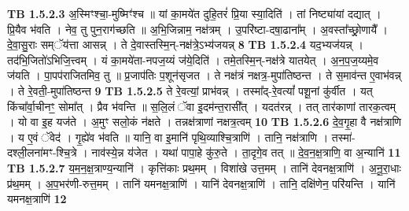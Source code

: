 \documentclass[17pt]{extarticle}
\begin{document}
                  \newline
                                \textbf{ TB 1.5.2.3} \newline
                  अ॒स्मिꣳश्चा॒-मुष्मिꣳ॑श्च ॥ यां का॒मये॑त दुहि॒तरं॑ प्रि॒या स्या॒दिति॑ । तां निष्ट्या॑यां दद्यात् । प्रि॒यैव भ॑वति । नेव॒ तु पुन॒राग॑च्छति ॥ अ॒भि॒जिन्नाम॒ नक्ष॑त्रम् । उ॒परि॑ष्टा-दषा॒ढाना᳚म् । अ॒वस्ता᳚च्छ्रो॒णायै᳚ । दे॒वा॒सु॒राः सम्ॅय॑त्ता आसन्न् । ते दे॒वास्तस्मि॒न्-नक्ष॑त्रे॒ऽभ्य॑जयन्न् \textbf{ 8} \newline
                  \newline
                                \textbf{ TB 1.5.2.4} \newline
                  यद॒भ्यज॑यन्न् । तद॑भि॒जितो॑ऽभिजि॒त्त्वम् । यं का॒मये॑ता-नपज॒य्यं ज॑ये॒दिति॑ । तमे॒तस्मि॒न्-नक्ष॑त्रे यातयेत् । अ॒न॒प॒ज॒य्यमे॒व ज॑यति । पा॒पप॑राजितमिव॒ तु ॥ प्र॒जाप॑तिः प॒शून॑सृजत । ते नक्ष॑त्रं नक्षत्र॒-मुपा॑तिष्ठन्त । ते स॒माव॑न्त ए॒वाभ॑वन्न् । ते रे॒वती॒-मुपा॑तिष्ठन्त \textbf{ 9} \newline
                  \newline
                                \textbf{ TB 1.5.2.5} \newline
                  ते रे॒वत्यां॒ प्राभ॑वन्न् । तस्मा᳚द्-रे॒वत्यां᳚ पशू॒नां कु॑र्वीत । यत् किंचा᳚र्वा॒चीनꣳ॒॒ सोमा᳚त् । प्रैव भ॑वन्ति ॥ स॒लि॒लं ॅवा इ॒दम॑न्त॒रासी᳚त् । यदत॑रन्न् । तत् तार॑काणां तारक॒त्वम् । यो वा इ॒ह यज॑ते । अ॒मुꣳ सलो॒कं न॑क्षते । तन्नक्ष॑त्राणां नक्षत्र॒त्वम् \textbf{ 10} \newline
                  \newline
                                \textbf{ TB 1.5.2.6} \newline
                  दे॒व॒गृ॒हा वै नक्ष॑त्राणि । य ए॒वं ॅवेद॑ । गृ॒ह्ये॑व भ॑वति ॥ यानि॒ वा इ॒मानि॑ पृथि॒व्याश्चि॒त्राणि॑ । तानि॒ नक्ष॑त्राणि । तस्मा॑-दश्ली॒लना॑मꣳ-श्चि॒त्रे । नाव॑स्ये॒न्न य॑जेत । यथा॑ पापा॒हे कु॑रु॒ते । ता॒दृगे॒व तत् ॥ दे॒व॒न॒क्ष॒त्राणि॒ वा अ॒न्यानि॑ \textbf{ 11} \newline
                  \newline
                                \textbf{ TB 1.5.2.7} \newline
                  य॒म॒न॒क्ष॒त्राण्य॒न्यानि॑ । कृत्ति॑काः प्रथ॒मम् । विशा॑खे उत्त॒मम् । तानि॑ देवनक्ष॒त्राणि॑ । अ॒नू॒रा॒धाः प्र॑थ॒मम् । अ॒प॒भर॑णी-रुत्त॒मम् । तानि॑ यमनक्ष॒त्राणि॑ । यानि॑ देवनक्ष॒त्राणि॑ । तानि॒ दक्षि॑णेन॒ परि॑यन्ति । यानि॑ यमनक्ष॒त्राणि॑ \textbf{ 12} \newline
                  \newline
\end{document}
